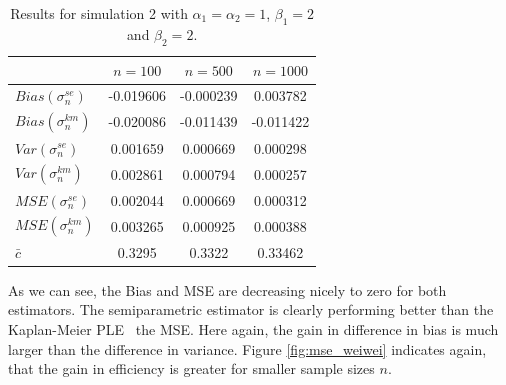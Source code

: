 \begin{table}[h!]
	\begin{center}
		\begin{tabular}{| l || c | c | c |}
			\hline
			&       $n=100$   &    $n=500$    &    $n=1000$\\
			\hline
			\hline
			$Bias(\sigma_n^{se})$ & -0.019606 & -0.000239 & 0.003782\\
			$Bias(\sigma_n^{km})$ & -0.020086 & -0.011439 & -0.011422\\
			\hline
			$Var(\sigma_n^{se})$ & 0.001659 & 0.000669 & 0.000298\\
			$Var(\sigma_n^{km})$ & 0.002861 & 0.000794 & 0.000257\\
			\hline
			$MSE(\sigma_n^{se})$ & 0.002044 & 0.000669 & 0.000312\\
			$MSE(\sigma_n^{km})$ & 0.003265 & 0.000925 & 0.000388\\
			\hline
			\hline
			$\bar c$ & 0.3295 & 0.3322 & 0.33462\\
			\hline
		\end{tabular}
	\end{center}
	\caption{Results for simulation 2 with  $\alpha_1 = \alpha_2 = 1$, $\beta_1 = 2$ and $\beta_2 = 2$.}
	\label{tab:res_weiwei1}
\end{table}
%
As we can see, the Bias and MSE are decreasing nicely to zero for both estimators. The semiparametric estimator is clearly performing better than the Kaplan-Meier PLE \wrt\ the MSE. Here again, the gain in difference in bias is much larger than the difference in variance. Figure \ref{fig:mse_weiwei} indicates again, that the gain in efficiency is greater for smaller sample sizes $n$.
